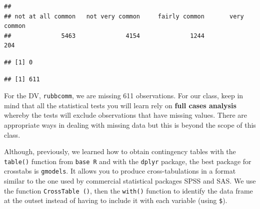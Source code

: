 \documentclass[
]{book}
\newenvironment{Shaded}{\begin{snugshade}}{\end{snugshade}}
\newcommand{\CommentTok}[1]{\textcolor[rgb]{0.56,0.35,0.01}{\textit{#1}}}
\newcommand{\FunctionTok}[1]{\textcolor[rgb]{0.00,0.00,0.00}{#1}}
\newcommand{\NormalTok}[1]{#1}
\newcommand{\SpecialCharTok}[1]{\textcolor[rgb]{0.00,0.00,0.00}{#1}}
\begin{document}
\begin{Shaded}
\end{Shaded}

\begin{verbatim}
## 
## not at all common   not very common     fairly common       very common 
##              5463              4154              1244               204
\end{verbatim}

\begin{Shaded}
\end{Shaded}

\begin{verbatim}
## [1] 0
\end{verbatim}

\begin{Shaded}
\end{Shaded}

\begin{verbatim}
## [1] 611
\end{verbatim}

For the DV, \texttt{rubbcomm}, we are missing 611 observations. For our class, keep in mind that all the statistical tests you will learn rely on \textbf{full cases analysis} whereby the tests will exclude observations that have missing values. There are appropriate ways in dealing with missing data but this is beyond the scope of this class.

Although, previously, we learned how to obtain contingency tables with the \texttt{table()} function from \texttt{base\ R} and with the \texttt{dplyr} package, the best package for crosstabs is \texttt{gmodels}. It allows you to produce cross-tabulations in a format similar to the one used by commercial statistical packages SPSS and SAS. We use the function \texttt{CrossTable\ ()}, then the \texttt{with()} function to identify the data frame at the outset instead of having to include it with each variable (using \texttt{\$}).
\end{document}
